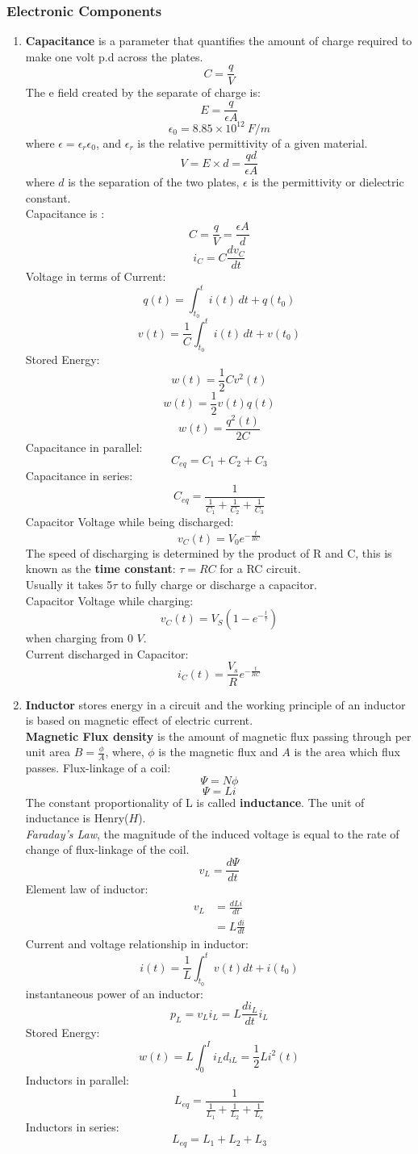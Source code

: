 \documentclass{article}
\begin{document}
\subsubsection{Electronic Components}
\begin{enumerate}
    \item \textbf{Capacitance} is a parameter that quantifies the amount of charge required to make one volt p.d across the plates.\\
\[C=\frac{q}{V}\]
The e field created by the separate of charge is:
\[E=\frac{q}{\epsilon A}\] 
\[\epsilon_0 =8.85\times10^12\ F/m\]
where $\epsilon = \epsilon_r \epsilon_0$, and $\epsilon_r$ is the relative permittivity of a given material. 
\[V=E\times d=\frac{qd}{\epsilon A}\]
where $d$ is the separation of the two plates, $\epsilon$ is the permittivity or dielectric constant.\\
Capacitance is :
\[C=\frac{q}{V}=\frac{\epsilon A}{d}\]
\[i_C = C\frac{dv_C}{dt}\]
Voltage in terms of Current:
\[q(t)=\int^t_{t_0}{i(t)\, dt+q(t_0)}\]
\[v(t)=\frac{1}{C}\int^t_{t_0}{i(t)\, dt+v(t_0)}\]
Stored Energy:
\[w(t)=\frac{1}{2}Cv^2(t)\]
\[w(t)=\frac{1}{2}v(t)q(t)\]
\[w(t)=\frac{q^2(t)}{2C}\]
Capacitance in parallel:
\[C_{eq} = C_1+C_2+C_3\]
Capacitance in series:
\[C_{eq}=\frac{1}{\frac{1}{C_1}+\frac{1}{C_2}+\frac{1}{C_3}}\]
Capacitor Voltage while being discharged:
\[v_{C}(t)=V_0e^{-\frac{t}{RC}}\]
The speed of discharging is determined by the product of R and C, this is known as the \textbf{time constant}: $\tau=RC$ for a RC circuit.\\
Usually it takes 5$\tau$ to fully charge or discharge a capacitor.\\
Capacitor Voltage while charging:
\[v_{C}(t)=V_S(1-e^{-\frac{t}{\tau}})\] when charging from 0 $V$.\\
Current discharged in Capacitor:
\[i_C(t)=\frac{V_s}{R}e^{-\frac{t}{RC}}\]
    \item \textbf{Inductor} stores energy in a circuit and the working principle of an inductor is based on magnetic effect of electric current.\\
\textbf{Magnetic Flux density} is the amount of magnetic flux passing through per unit area $B = \frac{\phi}{A}$, where, $\phi$ is the magnetic flux and $A$ is the area which flux passes.
Flux-linkage of a coil:
\[\Psi = N\phi\]
\[\Psi = Li\]
The constant proportionality of L is called \textbf{inductance}. The unit of inductance is Henry($H$). \\
\textit{Faraday's Law}, the magnitude of the induced voltage is equal to the rate of change of flux-linkage of the coil.
\[v_L=\frac{d\Psi}{dt}\]
Element law of inductor:
\begin{align*}
v_L &= \frac{dLi}{dt}\\
    &= L\frac{di}{dt}
\end{align*}
Current and voltage relationship in inductor:
\[i(t)=\frac{1}{L}\int^t_{t_0}v(t)dt+i(t_0)\]
instantaneous power of an inductor:
\[p_L =v_Li_L =L\frac{di_L}{dt}i_L\]
Stored Energy:
\[w(t)=L\int^{I}_{0}i_Ld_{iL} = \frac{1}{2}Li^2(t)\]
Inductors in parallel:
\[L_{eq}=\frac{1}{\frac{1}{L_1}+\frac{1}{L_2}+\frac{1}{L_e}}\]
Inductors in series:
\[L_{eq}=L_1+L_2+L_3\]
\end{enumerate}
\end{document}
